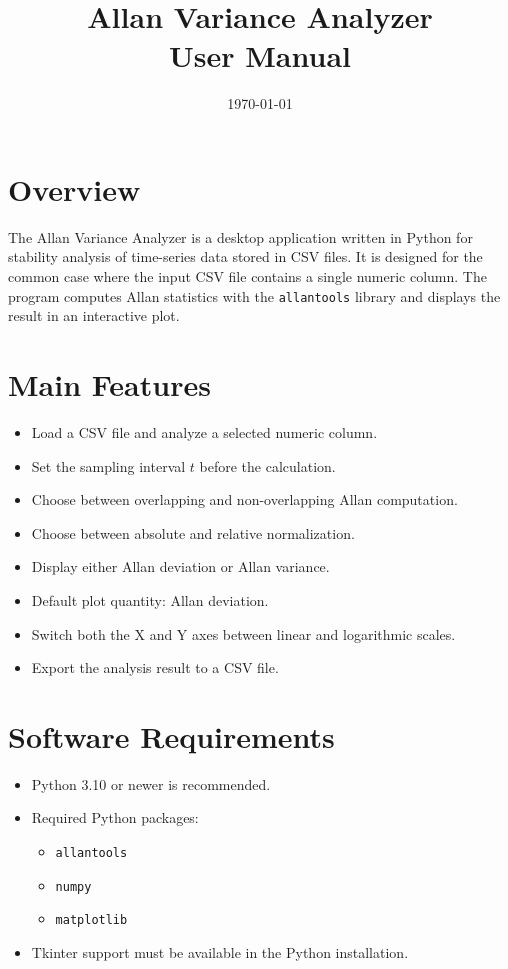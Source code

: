 \documentclass[11pt,a4paper]{article}
\title{Allan Variance Analyzer\\User Manual}
\author{}
\date{\today}
\begin{document}
\maketitle

\section{Overview}
The Allan Variance Analyzer is a desktop application written in Python for stability analysis of time-series data stored in CSV files. It is designed for the common case where the input CSV file contains a single numeric column. The program computes Allan statistics with the \texttt{allantools} library and displays the result in an interactive plot.

\section{Main Features}
\begin{itemize}[leftmargin=1.5em]
    \item Load a CSV file and analyze a selected numeric column.
    \item Set the sampling interval \(t\) before the calculation.
    \item Choose between overlapping and non-overlapping Allan computation.
    \item Choose between absolute and relative normalization.
    \item Display either Allan deviation or Allan variance.
    \item Default plot quantity: Allan deviation.
    \item Switch both the X and Y axes between linear and logarithmic scales.
    \item Export the analysis result to a CSV file.
\end{itemize}

\section{Software Requirements}
\begin{itemize}[leftmargin=1.5em]
    \item Python 3.10 or newer is recommended.
    \item Required Python packages:
    \begin{itemize}[leftmargin=1.5em]
        \item \texttt{allantools}
        \item \texttt{numpy}
        \item \texttt{matplotlib}
    \end{itemize}
    \item Tkinter support must be available in the Python installation.
\end{itemize}
\end{document}
